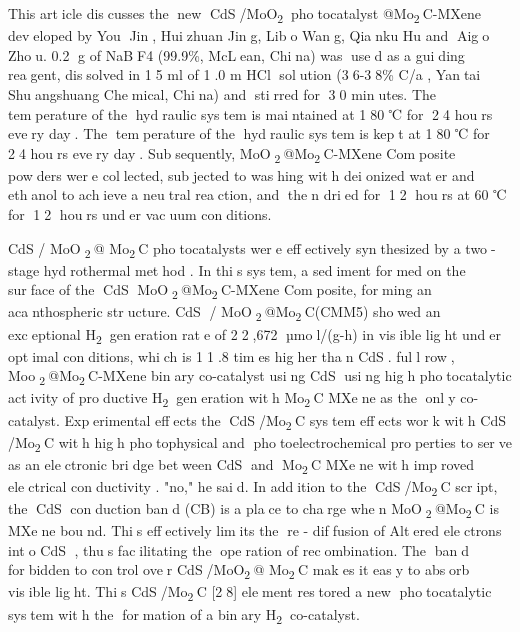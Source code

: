 {This article discusses the new CdS/MoO\textsubscript{2}
photocatalyst @Mo\textsubscript{2}C-MXene developed by You Jin,
Huizhuan Jing, Libo Wang, Qianku Hu and Aigo Zhou. 0.2 g of
NaBF4 (99.9\%, McLean, China) was used as a guiding reagent,
dissolved in 15 ml of 1.0 m HCl solution (36-38\% C/a , Yantai
Shuangshuang Chemical, China) and stirred for 30 minutes. The
temperature of the hydraulic system is maintained at 180 ℃ for
24 hours every day. The temperature of the hydraulic system is
kept at 180 ℃ for 24 hours every day. Subsequently,
MoO\textsubscript{2}@Mo\textsubscript{2}C-MXene Composite powders
were collected, subjected to washing with deionized water and
ethanol to achieve a neutral reaction, and then dried for 12
hours at 60 ℃ for 12 hours under vacuum conditions.

CdS / MoO\textsubscript{2}@ Mo\textsubscript{2}C photocatalysts
were effectively synthesized by a two-stage hydrothermal method .
In this system, a sediment formed on the surface of the CdS
MoO\textsubscript{2}@Mo\textsubscript{2}C-MXene Composite, forming
an acanthospheric structure. CdS /
MoO\textsubscript{2}@Mo\textsubscript{2}C(CMM5) showed an
exceptional H\textsubscript{2} generation rate of 22,672
µmol/(g-h) in visible light under optimal conditions, which is
11.8 times higher than CdS. full row,
Moo\textsubscript{2}@Mo\textsubscript{2}C-MXene binary co-catalyst
using CdS using high photocatalytic activity of productive
H\textsubscript{2} generation with Mo\textsubscript{2}C MXene as
the only co-catalyst. Experimental effects the
CdS/Mo\textsubscript{2}C system effects work with CdS
/Mo\textsubscript{2}C with high photophysical and
photoelectrochemical properties to serve as an electronic bridge
between CdS and Mo\textsubscript{2}C MXene with improved
electrical conductivity . "no," he said. In addition to the
CdS/Mo\textsubscript{2}C script, the CdS conduction band (CB) is
a place to charge when MoO\textsubscript{2}@Mo\textsubscript{2}C
is MXene bound. This effectively limits the re - diffusion of
Altered electrons into CdS , thus facilitating the operation of
recombination. The band forbidden to control over
CdS/MoO\textsubscript{2}@ Mo\textsubscript{2}C makes it easy to
absorb visible light. This CdS/Mo\textsubscript{2}C {[}28{]}
element restored a new photocatalytic system with the formation
of a binary H\textsubscript{2} co-catalyst.

}
